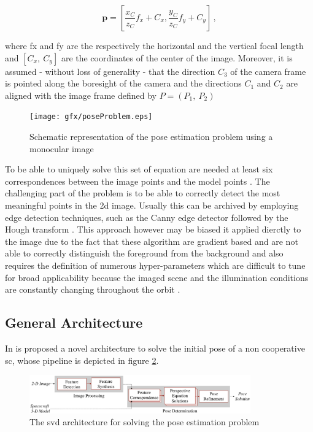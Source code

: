 \begin{equation}
  \mathbf{p} = \left[ \frac{x_C}{z_C} f_x + C_x , \frac{y_C}{z_C} f_y + C_y \right] \,,
  \label{eq:p}
\end{equation}

where \gls{fx} and \gls{fy} are the respectively the horizontal and the vertical focal length and $ \left[C_x, \ C_y \right]$ are the coordinates of the center of the image. Moreover, it is assumed - without loss of generality - that the direction $\mathit{C_3}$ of the camera frame is pointed along the boresight of the camera and the directions $\mathit{C_1}$ and $\mathit{C_2}$ are aligned with the image frame defined by $P = \left( \mathit{P_1}, \ \mathit{P_2} \right)$

\begin{figure}[htbp]
  \centering
  \texttt{[image: gfx/poseProblem.eps]}
  \caption{Schematic representation of the pose estimation problem using a monocular image \cite{Sharma2018}}
  \label{fig:theposeproblem}
\end{figure}

To be able to uniquely solve this set of equation are needed at least six correspondences between the image points and the model points \cite{10.1145/358669.358692}. The challenging part of the problem is to be able to correctly detect the most meaningful points in the \acrshort{2d} image. Usually this can be archived by employing edge detection techniques, such as the Canny edge detector \cite{10.1109/TPAMI.1986.4767851} followed by the Hough transform \cite{10.1145/361237.361242}. This approach however may be biased it applied dierctly to the image due to the fact that these algorithm are gradient based and are not able to correctly distinguish the foreground from the background and also requires the definition of numerous hyper-parameters which are difficult to tune for broad applicability because the imaged scene and the illumination conditions are constantly changing throughout the orbit \cite{Sharma2018}.

\subsection{General Architecture}
In \cite{Sharma2018} is proposed a novel architecture to solve the initial pose of a non cooperative \acrshort{sc}, whose pipeline is depicted in figure \ref{fig:theposeproblem}.

\begin{figure}[htbp]
  \centering
  \includegraphics[width=0.85\textwidth]{gfx/SVDPipeline.eps}
  \caption{The \acrshort{svd} architecture for solving the pose estimation problem \cite{Sharma2018}}
  \label{fig:theposeproblem}
\end{figure}

